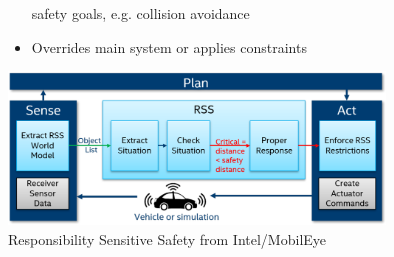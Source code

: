 \begin{frame}
\begin{columns}[T]
\begin{column}{0.65\textwidth}
\begin{itemize}
                safety goals, e.g. collision avoidance
            \item Overrides main system or applies constraints
        \end{itemize}
        \centering
        \includegraphics[width=0.75\textwidth]{images/intel_rss.png}\\
        \vspace{0.15cm}
        \tiny{Responsibility Sensitive Safety from Intel/MobilEye \cite{IntelRSS}}
    \end{column}
\end{columns}
\end{frame}





